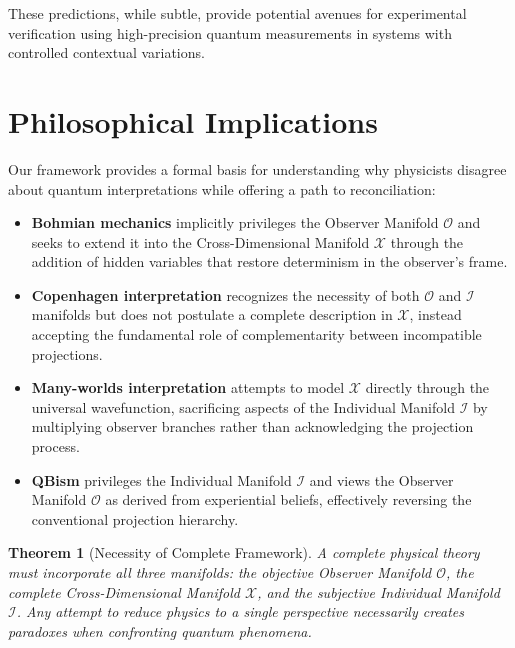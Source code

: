 \documentclass{article}
\newtheorem{theorem}{Theorem}
\begin{document}
These predictions, while subtle, provide potential avenues for experimental verification using high-precision quantum measurements in systems with controlled contextual variations.

\section{Philosophical Implications}

Our framework provides a formal basis for understanding why physicists disagree about quantum interpretations while offering a path to reconciliation:

\begin{itemize}
\item \textbf{Bohmian mechanics} implicitly privileges the Observer Manifold $\mathcal{O}$ and seeks to extend it into the Cross-Dimensional Manifold $\mathcal{X}$ through the addition of hidden variables that restore determinism in the observer's frame.

\item \textbf{Copenhagen interpretation} recognizes the necessity of both $\mathcal{O}$ and $\mathcal{I}$ manifolds but does not postulate a complete description in $\mathcal{X}$, instead accepting the fundamental role of complementarity between incompatible projections.

\item \textbf{Many-worlds interpretation} attempts to model $\mathcal{X}$ directly through the universal wavefunction, sacrificing aspects of the Individual Manifold $\mathcal{I}$ by multiplying observer branches rather than acknowledging the projection process.

\item \textbf{QBism} privileges the Individual Manifold $\mathcal{I}$ and views the Observer Manifold $\mathcal{O}$ as derived from experiential beliefs, effectively reversing the conventional projection hierarchy.
\end{itemize}

\begin{theorem}[Necessity of Complete Framework]
A complete physical theory must incorporate all three manifolds: the objective Observer Manifold $\mathcal{O}$, the complete Cross-Dimensional Manifold $\mathcal{X}$, and the subjective Individual Manifold $\mathcal{I}$. Any attempt to reduce physics to a single perspective necessarily creates paradoxes when confronting quantum phenomena.
\end{theorem}
\end{document}
